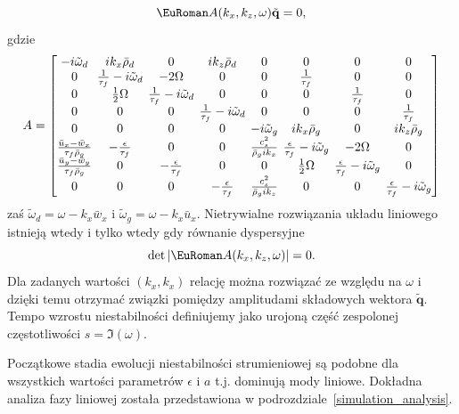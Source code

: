 \begin{equation}
 \eurom{A}(k_x,k_z,\omega)\tilde{\mathbf{q}} = 0,
 \label{eq:linset}
\end{equation}
gdzie 
\begin{equation}
 A =
 \setlength\arraycolsep{2pt}
 \begin{bmatrix}
    -i\tilde{\omega}_d & i k_x \bar{\rho}_d & 0 & i k_z \bar{\rho}_d & 0 & 0 & 0 & 0 \\
    0 & \frac{1}{\tau_f} -i \tilde{\omega}_d & -2\Omega & 0 & 0 & \frac{1}{\tau_f} & 0 & 0 \\
    0 & \frac{1}{2}\Omega & \frac{1}{\tau_f} -i \tilde{\omega}_d & 0 & 0 & 0 & \frac{1}{\tau_f} & 0 \\
    0 & 0 & 0 & \frac{1}{\tau_f} -i \tilde{\omega}_d & 0 & 0 & 0 & \frac{1}{\tau_f} \\
    0 & 0 & 0 & 0 & -i\tilde{\omega}_g & i k_x \bar{\rho}_g & 0 & i k_z \bar{\rho}_g \\
    \frac{\bar{u}_x - \bar{w}_x}{\tau_f \bar{\rho}_g} & -\frac{\epsilon}{\tau_f} & 0 & 0 &
    \frac{c_s^2}{\bar{\rho}_g i k_x} & \frac{\epsilon}{\tau_f}-i\tilde{\omega}_g &
    -2\Omega & 0\\
    \frac{\bar{u}_y - \bar{w}_y}{\tau_f \bar{\rho}_g} & 0 & -\frac{\epsilon}{\tau_f} & 0 & 0 &
    \frac{1}{2}\Omega & \frac{\epsilon}{\tau_f} -i \tilde{\omega}_g & 0 \\
    0 & 0 & 0 & -\frac{\epsilon}{\tau_f} & \frac{c_s^2}{\bar{\rho}_g i k_z} & 0 & 0 &
    \frac{\epsilon}{\tau_f} -i \tilde{\omega}_g
 \end{bmatrix}
%
\end{equation}
zaś $\tilde{\omega}_d = \omega - k_x \bar{w}_x$ i $\tilde{\omega}_g = \omega -
k_x \bar{u}_x$.
%
Nietrywialne rozwiązania układu liniowego  istnieją wtedy i tylko
wtedy gdy równanie dyspersyjne 
\begin{equation}
 \det|\eurom{A}(k_x,k_z,\omega)|=0.
 \label{eq:disprel}
\end{equation}
%
Dla zadanych wartości $(k_x, k_x)$ relację  można rozwiązać ze
względu na $\omega$ i dzięki temu otrzymać związki pomiędzy amplitudami
składowych wektora $\tilde{\mathbf{q}}$.
Tempo wzrostu niestabilności definiujemy jako urojoną część zespolonej
częstotliwości $s=\Im(\omega)$.
%

Początkowe stadia ewolucji niestabilności strumieniowej są podobne dla
wszystkich wartości parametrów $\epsilon$ i $a$ t.j. dominują mody liniowe.
Dokładna analiza fazy liniowej została przedstawiona w
podrozdziale~\ref{simulation_analysis}.


